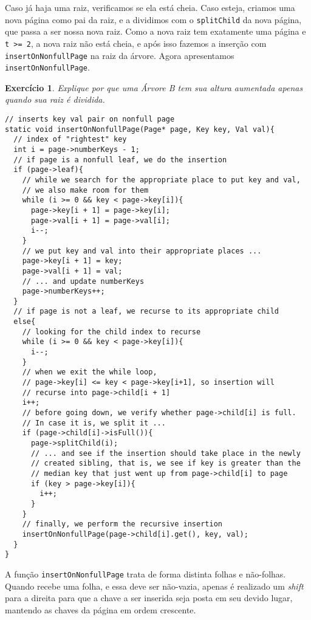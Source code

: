 \documentclass[11pt]{article}
\newtheorem{exercicio}{Exercício}
\begin{document}
Caso já haja uma raiz, verificamos se ela está cheia.  Caso
esteja, criamos uma nova página como pai da raiz, e a dividimos
com o \texttt{splitChild} da nova página, que passa a ser nossa nova
raiz.  Como a nova raiz tem exatamente uma página e \texttt{t >= 2}, a
nova raiz não está cheia, e após isso fazemos a inserção com
\texttt{insertOnNonfullPage} na raiz da árvore.  Agora apresentamos
\texttt{insertOnNonfullPage}.

\begin{exercicio}
Explique por que uma Árvore B tem sua altura aumentada apenas
quando sua raiz é dividida.
\end{exercicio}

\pagebreak

\begin{verbatim}
// inserts key val pair on nonfull page
static void insertOnNonfullPage(Page* page, Key key, Val val){
  // index of "rightest" key
  int i = page->numberKeys - 1;
  // if page is a nonfull leaf, we do the insertion
  if (page->leaf){
    // while we search for the appropriate place to put key and val,
    // we also make room for them
    while (i >= 0 && key < page->key[i]){
      page->key[i + 1] = page->key[i];
      page->val[i + 1] = page->val[i];
      i--;
    }
    // we put key and val into their appropriate places ...
    page->key[i + 1] = key;
    page->val[i + 1] = val;
    // ... and update numberKeys
    page->numberKeys++;
  }
  // if page is not a leaf, we recurse to its appropriate child
  else{
    // looking for the child index to recurse
    while (i >= 0 && key < page->key[i]){
      i--;
    }
    // when we exit the while loop,
    // page->key[i] <= key < page->key[i+1], so insertion will
    // recurse into page->child[i + 1]
    i++;
    // before going down, we verify whether page->child[i] is full.
    // In case it is, we split it ...
    if (page->child[i]->isFull()){
      page->splitChild(i);
      // ... and see if the insertion should take place in the newly
      // created sibling, that is, we see if key is greater than the
      // median key that just went up from page->child[i] to page
      if (key > page->key[i]){
        i++;
      }
    }
    // finally, we perform the recursive insertion
    insertOnNonfullPage(page->child[i].get(), key, val);
  }
}
\end{verbatim}

A função \texttt{insertOnNonfullPage} trata de forma distinta folhas e
não-folhas.  Quando recebe uma folha, e essa deve ser não-vazia,
apenas é realizado um \emph{shift} para a direita para que a chave a
ser inserida seja posta em seu devido lugar, mantendo as chaves da
página em ordem crescente.
\end{document}
